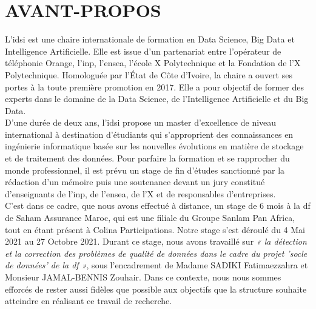 \cleardoublepage
{}
{}
\chapter*{AVANT-PROPOS}

\begin{small}

L'\acrlong{idsi} est une chaire internationale de formation en Data Science, Big Data et Intelligence Artificielle. Elle est issue d’un partenariat entre l'opérateur de  téléphonie Orange, l'\acrfull{inp}, l'\acrfull{ensea}, l'\'ecole X  Polytechnique et la Fondation de l'X Polytechnique. Homologuée par l'État de Côte d'Ivoire, la chaire a ouvert ses portes à la toute première promotion en 2017. Elle a pour objectif de former des experts dans le domaine de la Data Science, de l'Intelligence Artificielle et du Big Data.\\

D’une durée de deux ans, l’\acrshort{idsi} propose un master d’excellence de niveau international à destination d’étudiants qui s'approprient des connaissances en ingénierie informatique basée sur les nouvelles évolutions en matière de stockage et de traitement des données.  Pour parfaire la formation et se rapprocher du monde professionnel, il est prévu un stage de fin d'études sanctionné par la rédaction d'un mémoire puis une soutenance devant un jury constitu\'e d'enseignants de l'\acrshort{inp}, de l'\acrshort{ensea}, de l'X et de responsables d'entreprises. \\

C'est dans ce cadre, que nous avons effectu\'e \`a distance, un stage de 6 mois à la \acrlong{df} de Saham Assurance Maroc, qui est une filiale du Groupe Sanlam Pan Africa, tout en \'etant pr\'esent \`a Colina Participations.  Notre stage s'est d\'eroul\'e du 4 Mai 2021 au 27 Octobre 2021. Durant ce stage, nous avons travaill\'e sur \textit{« la d\'etection et la correction des problèmes de qualité de données dans le cadre du projet 'socle de données' de la \acrlong{df} »}, sous l’encadrement de Madame SADIKI Fatimaezzahra et Monsieur JAMAL-BENNIS Zouhair. Dans ce contexte, nous nous sommes efforcés de rester aussi fidèles que possible aux objectifs que la structure souhaite atteindre en r\'ealisant ce travail de recherche.

\end{small}
